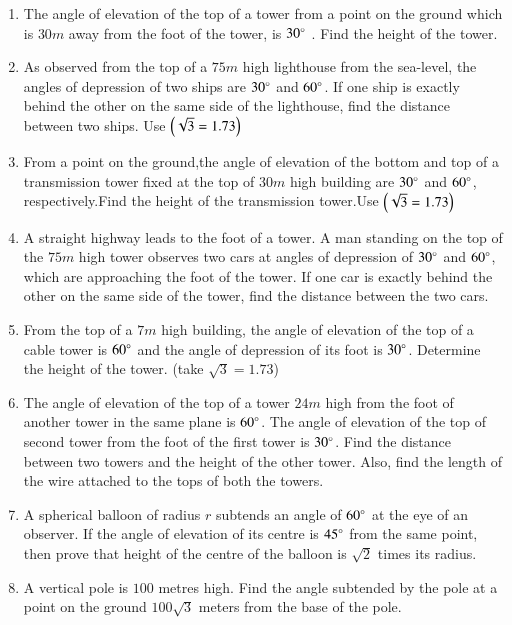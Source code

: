 \begin{enumerate}[label=\thesubsection.\arabic*.,ref=\thesubsection.\theenumi]
%
\hfill{}\item  The angle of elevation of the top of a tower from a point on the ground which is $30m$ away from the foot of the tower, is $30\degree$ . Find the height of the tower. 
%
\hfill{}\item  As observed from the top of a $75m$ high lighthouse from the sea-level, the angles of depression of two ships are $30\degree$ and $60\degree$. If one ship is exactly behind the other on the same side of the lighthouse, find the distance between two ships. Use $\left(\sqrt{3} = 1. 73\right)$
%
\hfill{}\item  From a point on the ground,the angle of elevation of the bottom and top of a transmission tower fixed at the top of $30m$ high building are $30\degree$ and $60\degree$, respectively.Find the height of the transmission tower.Use $\left(\sqrt{3} = 1.73\right)$
 \hfill{}   
%
\item A straight highway leads to the foot of a tower. A man standing on the top of the $75m$ high tower observes two cars at angles of depression of $30\degree$ and $60\degree$, which are approaching the foot of the tower. If one car is exactly behind the other on the same side of the tower, find the distance between the two cars.
    \hfill{}\item From the top of a $7m$ high building, the angle of elevation of the top of a cable tower is $60\degree$ and the angle of depression of its foot is $30\degree$. Determine the height of the tower. (take $\sqrt{3}=1. 73$)
\hfill{}\item The angle of elevation of the top of a tower $24m$ high from the foot of another tower in the same plane is ${60}{\degree}$. The angle of elevation of the top of second tower from the foot of the first tower is ${30}{\degree}$. Find the distance between two towers and the height of the other tower. Also, find the length of the wire attached to the tops of both the towers.
\hfill{}\item A spherical balloon of radius $r$ subtends an angle of ${60}{\degree}$ at the eye of an observer. If the angle of elevation of its centre is ${45}{\degree}$ from the same point, then prove that height of the centre of the balloon is $\sqrt{2}$ times its radius.
    \hfill{}
%
\item A vertical pole is $100$ metres high. Find the angle subtended by the pole at a point on
the ground $100 \sqrt{3}$ meters from the base of the pole.

\end{enumerate}
